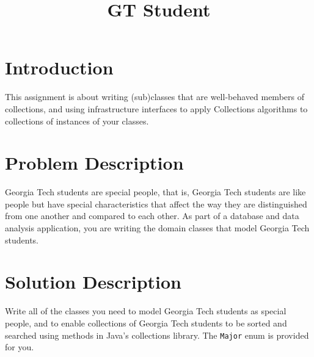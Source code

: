 \documentclass[12pt]{article}
\title{GT Student}
\author{}
\date{}
\begin{document}
\maketitle

\section{Introduction}

This assignment is about writing (sub)classes that are well-behaved members of collections, and using infrastructure interfaces to apply Collections algorithms to collections of instances of your classes.

\section{Problem Description}

Georgia Tech students are special people, that is, Georgia Tech students are like people but have special characteristics that affect the way they are distinguished from one another and compared to each other.  As part of a database and data analysis application, you are writing the domain classes that model Georgia Tech students.

\section{Solution Description}

Write all of the classes you need to model Georgia Tech students as special people, and to enable collections of Georgia Tech students to be sorted and searched using methods in Java's collections library.  The {\tt Major} enum is provided for you.
\end{document}
